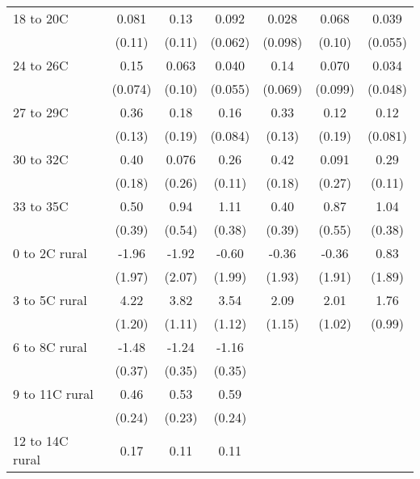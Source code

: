 \documentclass[paper=letterpaper, fontsize=11pt]{article} %
\begin{document}
\begin{longtable}{l*{6}{c}}
18 to 20C           &       0.081&        0.13&       0.092&       0.028&       0.068&       0.039\\
                    &      (0.11)&      (0.11)&     (0.062)&     (0.098)&      (0.10)&     (0.055)\\
24 to 26C           &        0.15&       0.063&       0.040&        0.14&       0.070&       0.034\\
                    &     (0.074)&      (0.10)&     (0.055)&     (0.069)&     (0.099)&     (0.048)\\
27 to 29C           &        0.36&        0.18&        0.16&        0.33&        0.12&        0.12\\
                    &      (0.13)&      (0.19)&     (0.084)&      (0.13)&      (0.19)&     (0.081)\\
30 to 32C           &        0.40&       0.076&        0.26&        0.42&       0.091&        0.29\\
                    &      (0.18)&      (0.26)&      (0.11)&      (0.18)&      (0.27)&      (0.11)\\
33 to 35C           &        0.50&        0.94&        1.11&        0.40&        0.87&        1.04\\
                    &      (0.39)&      (0.54)&      (0.38)&      (0.39)&      (0.55)&      (0.38)\\
0 to 2C rural       &       -1.96&       -1.92&       -0.60&       -0.36&       -0.36&        0.83\\
                    &      (1.97)&      (2.07)&      (1.99)&      (1.93)&      (1.91)&      (1.89)\\
3 to 5C rural       &        4.22&        3.82&        3.54&        2.09&        2.01&        1.76\\
                    &      (1.20)&      (1.11)&      (1.12)&      (1.15)&      (1.02)&      (0.99)\\
6 to 8C rural       &       -1.48&       -1.24&       -1.16&            &            &            \\
                    &      (0.37)&      (0.35)&      (0.35)&            &            &            \\
9 to 11C rural      &        0.46&        0.53&        0.59&            &            &            \\
                    &      (0.24)&      (0.23)&      (0.24)&            &            &            \\
12 to 14C rural     &        0.17&        0.11&        0.11&            &            &            \\

\end{longtable}
\end{document}
